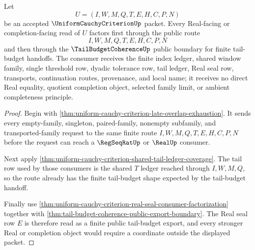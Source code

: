 \begin{theorem}
\label{thm:uniform-cauchy-criterion-tail-budget-real-route}
Let
$$
U=(I,W,M,Q,T,E,H,C,P,N)
$$
be an accepted $\UniformCauchyCriterionUp$ packet. Every Real-facing or completion-facing read of $U$ factors first through the public route
$$
I,W,M,Q,T,E,H,C,P,N
$$
and then through the $\TailBudgetCoherenceUp$ public boundary for finite tail-budget handoffs. The consumer receives the finite index ledger, shared window family, single threshold row, dyadic tolerance row, tail ledger, Real seal row, transports, continuation routes, provenance, and local name; it receives no direct Real equality, quotient completion object, selected family limit, or ambient completeness principle.
\end{theorem}
\begin{proof}
Begin with \autoref{thm:uniform-cauchy-criterion-late-overlap-exhaustion}. It sends every empty-family, singleton, paired-family, nonempty subfamily, and transported-family request to the same finite route $I,W,M,Q,T,E,H,C,P,N$ before the request can reach a $\RegSeqRatUp$ or $\RealUp$ consumer.

Next apply \autoref{thm:uniform-cauchy-criterion-shared-tail-ledger-coverage}. The tail row used by those consumers is the shared $T$ ledger reached through $I,W,M,Q$, so the route already has the finite tail-budget shape expected by the tail-budget handoff.

Finally use \autoref{thm:uniform-cauchy-criterion-real-seal-consumer-factorization} together with \autoref{thm:tail-budget-coherence-public-export-boundary}. The Real seal row $E$ is therefore read as a finite public tail-budget export, and every stronger Real or completion object would require a coordinate outside the displayed packet.
\end{proof}

